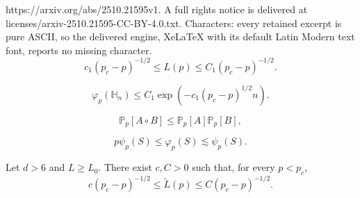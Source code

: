 \documentclass[10pt,a4paper]{amsart}
\def\P{\mathbb{P}} %
\begin{document}
https://arxiv.org/abs/2510.21595v1. A full rights notice is delivered at licenses/arxiv-2510.21595-CC-BY-4.0.txt. Characters: every retained excerpt is pure ASCII, so the delivered engine, XeLaTeX with its default Latin Modern text font, reports no missing character.
	\begin{equation}\label{eq:input L(p)}
		c_1(p_c-p)^{-1/2}\leq L(p)\leq C_1(p_c-p)^{-1/2}.
	\end{equation}

	\begin{equation}\label{eq:input Phi(H_n)}
		\varphi_p(\mathbb H_n)\leq C_1\exp\left(-c_1(p_c-p)^{1/2}n\right).
	\end{equation}

\begin{equation}\tag{BK}\label{eq:BK}
	\P_p[A\circ B]\leq \P_p[A]\P_p[B],
\end{equation}

\begin{equation}\label{eq:comparison psi phi}
	p\psi_{p}(S)\leq \varphi_{p}(S) \lesssim \psi_{p}(S).
\end{equation}

\begin{Prop}\label{prop:equivalence of sharp length}
 Let $d>6$ and $L\geq L_0$. There exist $c,C>0$ such that, for every $p<p_c$,
\begin{equation}
	c(p_c-p)^{-1/2}\leq \tilde{L}(p)\leq C(p_c-p)^{-1/2}.
\end{equation}
\end{Prop}
\end{document}
